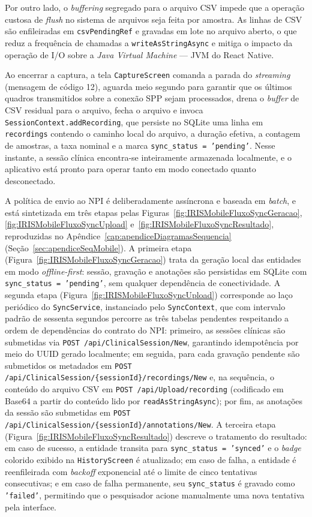 Por outro lado, o \textit{buffering} segregado para o arquivo CSV impede que a operação custosa de \textit{flush} no sistema de arquivos seja feita por amostra. As linhas de CSV são enfileiradas em \texttt{csvPendingRef} e gravadas em lote no arquivo aberto, o que reduz a frequência de chamadas a \texttt{writeAsStringAsync} e mitiga o impacto da operação de I/O sobre a \textit{Java Virtual Machine} --- JVM do React Native.

Ao encerrar a captura, a tela \texttt{CaptureScreen} comanda a parada do \textit{streaming} (mensagem de código 12), aguarda meio segundo para garantir que os últimos quadros transmitidos sobre a conexão SPP sejam processados, drena o \textit{buffer} de CSV residual para o arquivo, fecha o arquivo e invoca \texttt{SessionContext.addRecording}, que persiste no SQLite uma linha em \texttt{recordings} contendo o caminho local do arquivo, a duração efetiva, a contagem de amostras, a taxa nominal e a marca \texttt{sync\_status = 'pending'}. Nesse instante, a sessão clínica encontra-se inteiramente armazenada localmente, e o aplicativo está pronto para operar tanto em modo conectado quanto desconectado.

A política de envio ao NPI é deliberadamente assíncrona e baseada em \textit{batch}, e está sintetizada em três etapas pelas Figuras~\ref{fig:IRISMobileFluxoSyncGeracao}, \ref{fig:IRISMobileFluxoSyncUpload} e~\ref{fig:IRISMobileFluxoSyncResultado}, reproduzidas no Apêndice~\ref{cap:apendiceDiagramasSequencia} (Seção~\ref{sec:apendiceSeqMobile}). A primeira etapa (Figura~\ref{fig:IRISMobileFluxoSyncGeracao}) trata da geração local das entidades em modo \textit{offline-first}: sessão, gravação e anotações são persistidas em SQLite com \texttt{sync\_status = 'pending'}, sem qualquer dependência de conectividade. A segunda etapa (Figura~\ref{fig:IRISMobileFluxoSyncUpload}) corresponde ao laço periódico do \texttt{SyncService}, instanciado pelo \texttt{SyncContext}, que com intervalo padrão de sessenta segundos percorre as três tabelas pendentes respeitando a ordem de dependências do contrato do NPI: primeiro, as sessões clínicas são submetidas via \texttt{POST /api/ClinicalSession/New}, garantindo idempotência por meio do UUID gerado localmente; em seguida, para cada gravação pendente são submetidos os metadados em \texttt{POST /api/ClinicalSession/\{sessionId\}/recordings/New} e, na sequência, o conteúdo do arquivo CSV em \texttt{POST /api/Upload/recording} (codificado em Base64 a partir do conteúdo lido por \texttt{readAsStringAsync}); por fim, as anotações da sessão são submetidas em \texttt{POST /api/ClinicalSession/\{sessionId\}/annotations/New}. A terceira etapa (Figura~\ref{fig:IRISMobileFluxoSyncResultado}) descreve o tratamento do resultado: em caso de sucesso, a entidade transita para \texttt{sync\_status = 'synced'} e o \textit{badge} colorido exibido na \texttt{HistoryScreen} é atualizado; em caso de falha, a entidade é reenfileirada com \textit{backoff} exponencial até o limite de cinco tentativas consecutivas; e em caso de falha permanente, seu \texttt{sync\_status} é gravado como \texttt{'failed'}, permitindo que o pesquisador acione manualmente uma nova tentativa pela interface.

